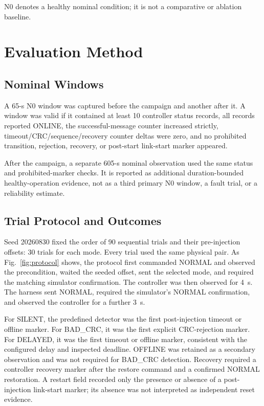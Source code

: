 \documentclass[conference]{IEEEtran}
\begin{document}
N0 denotes a healthy nominal condition; it is not a comparative or ablation baseline.

\section{Evaluation Method}

\subsection{Nominal Windows}

A 65-s N0 window was captured before the campaign and another after it. A window was valid if it contained at least 10 controller status records, all records reported ONLINE, the successful-message counter increased strictly, timeout/CRC/sequence/recovery counter deltas were zero, and no prohibited transition, rejection, recovery, or post-start link-start marker appeared.

After the campaign, a separate 605-s nominal observation used the same status and prohibited-marker checks. It is reported as additional duration-bounded healthy-operation evidence, not as a third primary N0 window, a fault trial, or a reliability estimate.

\subsection{Trial Protocol and Outcomes}

Seed 20260830 fixed the order of 90 sequential trials and their pre-injection offsets: 30 trials for each mode. Every trial used the same physical pair. As Fig.~\ref{fig:protocol} shows, the protocol first commanded NORMAL and observed the precondition, waited the seeded offset, sent the selected mode, and required the matching simulator confirmation. The controller was then observed for 4~s. The harness sent NORMAL, required the simulator's NORMAL confirmation, and observed the controller for a further 3~s.

For SILENT, the predefined detector was the first post-injection timeout or offline marker. For BAD\_CRC, it was the first explicit CRC-rejection marker. For DELAYED, it was the first timeout or offline marker, consistent with the configured delay and inspected deadline. OFFLINE was retained as a secondary observation and was not required for BAD\_CRC detection. Recovery required a controller recovery marker after the restore command and a confirmed NORMAL restoration. A restart field recorded only the presence or absence of a post-injection link-start marker; its absence was not interpreted as independent reset evidence.
\end{document}
